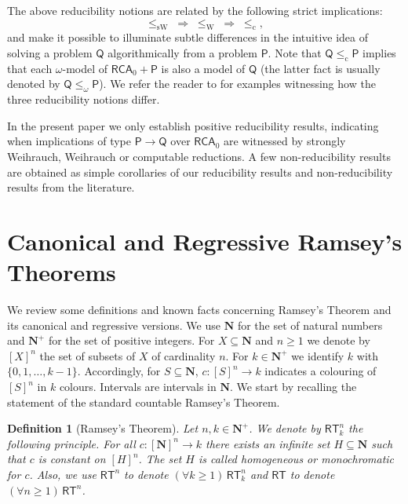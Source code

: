 \documentclass[a4paper,11pt]{article}
\newtheorem{definition}{Definition}
\newcommand\Nat{\mathbf{N}}
\newcommand\RCA{\mathsf{RCA}}
\newcommand\RT{\mathsf{RT}}
\newcommand\compred{\mathrm{c}}
\newcommand\scompred{\mathrm{sc}}
\newcommand\W{\mathrm{W}}
\newcommand\sW{\mathrm{sW}}
\newcommand\Q{\mathsf{Q}}
\newcommand\PP{\mathsf{P}}
\begin{document}
The above reducibility notions are related by the following strict implications: 
$$ \leq_\sW \;\Longrightarrow\; \leq_\W \;\Longrightarrow\; \leq_{\mathrm{c}},$$
and make it possible to illuminate subtle differences in the intuitive idea of solving a problem $\Q$ algorithmically from a problem
$\PP$. Note that $\Q \leq_{\mathrm{c}}\PP$ implies that each $\omega$-model of $\RCA_0 + \PP$ is also a model of $\Q$
(the latter fact is usually denoted by $\Q\leq_\omega\PP$). We refer the reader to \cite{Dza-Mum:22} for examples 
witnessing how the three reducibility notions differ.

In the present paper we only establish positive reducibility results, indicating when implications of type $\PP\to \Q$ over
$\RCA_0$ are witnessed by strongly Weihrauch, Weihrauch or computable reductions. A few non-reducibility results are obtained as simple corollaries of our reducibility results and non-reducibility results from the literature. 

\section{Canonical and Regressive Ramsey's Theorems} 

We review some definitions and known facts concerning Ramsey's Theorem and its canonical and regressive versions. 
We use $\Nat$ for the set of natural numbers and $\Nat^+$ for the 
set of positive integers. For $X\subseteq \Nat$ and $n\geq 1$ we denote by $[X]^n$ the set of 
subsets of $X$ of cardinality $n$. For $k\in\Nat^+$ we identify $k$ with $\{0, 1, \dots, k-1\}$. Accordingly, 
for $S\subseteq \Nat$, $c:[S]^n \to k$ indicates a colouring of $[S]^n$ in $k$ colours. Intervals 
are intervals in $\Nat$. We start by 
recalling the statement of the standard countable Ramsey's Theorem.

\begin{definition}[Ramsey's Theorem]
Let $n, k\in\Nat^+$. We denote by $\RT^n_k$ the following principle. For all $c:[\Nat]^n \to k$ there exists
an infinite set $H\subseteq \Nat$ such that $c$ is constant on $[H]^n$. The set $H$ is called homogeneous
or monochromatic for $c$. Also, we use $\RT^n$ to denote $(\forall k \geq 1)\,\RT^n_k$ and $\RT$ to denote $(\forall n \geq 1)\,\RT^n$.
\end{definition}
\end{document}
